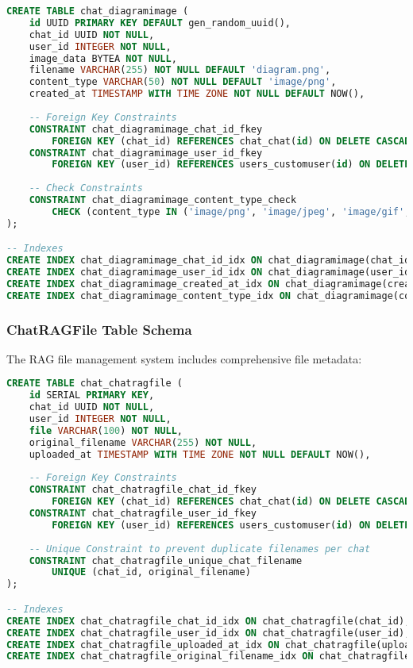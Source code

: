 \documentclass[12pt,a4paper]{article}
\begin{document}
\begin{lstlisting}[language=SQL, caption=DiagramImage Table Structure]
CREATE TABLE chat_diagramimage (
    id UUID PRIMARY KEY DEFAULT gen_random_uuid(),
    chat_id UUID NOT NULL,
    user_id INTEGER NOT NULL,
    image_data BYTEA NOT NULL,
    filename VARCHAR(255) NOT NULL DEFAULT 'diagram.png',
    content_type VARCHAR(50) NOT NULL DEFAULT 'image/png',
    created_at TIMESTAMP WITH TIME ZONE NOT NULL DEFAULT NOW(),
    
    -- Foreign Key Constraints
    CONSTRAINT chat_diagramimage_chat_id_fkey 
        FOREIGN KEY (chat_id) REFERENCES chat_chat(id) ON DELETE CASCADE,
    CONSTRAINT chat_diagramimage_user_id_fkey 
        FOREIGN KEY (user_id) REFERENCES users_customuser(id) ON DELETE CASCADE,
    
    -- Check Constraints
    CONSTRAINT chat_diagramimage_content_type_check 
        CHECK (content_type IN ('image/png', 'image/jpeg', 'image/gif', 'image/svg+xml'))
);

-- Indexes
CREATE INDEX chat_diagramimage_chat_id_idx ON chat_diagramimage(chat_id);
CREATE INDEX chat_diagramimage_user_id_idx ON chat_diagramimage(user_id);
CREATE INDEX chat_diagramimage_created_at_idx ON chat_diagramimage(created_at DESC);
CREATE INDEX chat_diagramimage_content_type_idx ON chat_diagramimage(content_type);
\end{lstlisting}

\subsubsection{ChatRAGFile Table Schema}

The RAG file management system includes comprehensive file metadata:

\begin{lstlisting}[language=SQL, caption=ChatRAGFile Table Structure]
CREATE TABLE chat_chatragfile (
    id SERIAL PRIMARY KEY,
    chat_id UUID NOT NULL,
    user_id INTEGER NOT NULL,
    file VARCHAR(100) NOT NULL,
    original_filename VARCHAR(255) NOT NULL,
    uploaded_at TIMESTAMP WITH TIME ZONE NOT NULL DEFAULT NOW(),
    
    -- Foreign Key Constraints
    CONSTRAINT chat_chatragfile_chat_id_fkey 
        FOREIGN KEY (chat_id) REFERENCES chat_chat(id) ON DELETE CASCADE,
    CONSTRAINT chat_chatragfile_user_id_fkey 
        FOREIGN KEY (user_id) REFERENCES users_customuser(id) ON DELETE CASCADE,
    
    -- Unique Constraint to prevent duplicate filenames per chat
    CONSTRAINT chat_chatragfile_unique_chat_filename 
        UNIQUE (chat_id, original_filename)
);

-- Indexes
CREATE INDEX chat_chatragfile_chat_id_idx ON chat_chatragfile(chat_id);
CREATE INDEX chat_chatragfile_user_id_idx ON chat_chatragfile(user_id);
CREATE INDEX chat_chatragfile_uploaded_at_idx ON chat_chatragfile(uploaded_at DESC);
CREATE INDEX chat_chatragfile_original_filename_idx ON chat_chatragfile(original_filename);
\end{lstlisting}
\end{document}
